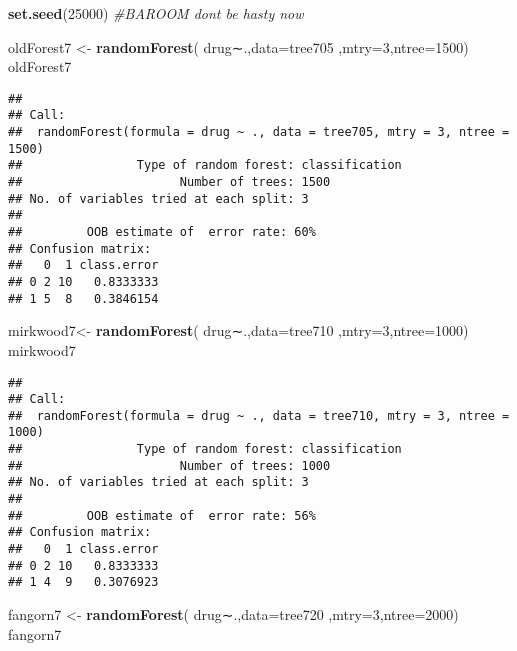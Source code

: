 \documentclass[]{article}
\newenvironment{Shaded}{\begin{snugshade}}{\end{snugshade}}
\newcommand{\KeywordTok}[1]{\textcolor[rgb]{0.13,0.29,0.53}{\textbf{#1}}}
\newcommand{\DataTypeTok}[1]{\textcolor[rgb]{0.13,0.29,0.53}{#1}}
\newcommand{\DecValTok}[1]{\textcolor[rgb]{0.00,0.00,0.81}{#1}}
\newcommand{\StringTok}[1]{\textcolor[rgb]{0.31,0.60,0.02}{#1}}
\newcommand{\CommentTok}[1]{\textcolor[rgb]{0.56,0.35,0.01}{\textit{#1}}}
\newcommand{\NormalTok}[1]{#1}
\begin{document}
\begin{Shaded}
\begin{Highlighting}[]
\KeywordTok{set.seed}\NormalTok{(}\DecValTok{25000}\NormalTok{)}
\CommentTok{#BAROOM dont be hasty now}

\NormalTok{oldForest7 <-}\StringTok{ }\KeywordTok{randomForest}\NormalTok{( drug∼.,}\DataTypeTok{data=}\NormalTok{tree705  ,}\DataTypeTok{mtry=}\DecValTok{3}\NormalTok{,}\DataTypeTok{ntree=}\DecValTok{1500}\NormalTok{)}
\NormalTok{oldForest7}
\end{Highlighting}
\end{Shaded}

\begin{verbatim}
## 
## Call:
##  randomForest(formula = drug ~ ., data = tree705, mtry = 3, ntree = 1500) 
##                Type of random forest: classification
##                      Number of trees: 1500
## No. of variables tried at each split: 3
## 
##         OOB estimate of  error rate: 60%
## Confusion matrix:
##   0  1 class.error
## 0 2 10   0.8333333
## 1 5  8   0.3846154
\end{verbatim}

\begin{Shaded}
\begin{Highlighting}[]
\NormalTok{mirkwood7<-}\StringTok{ }\KeywordTok{randomForest}\NormalTok{( drug∼.,}\DataTypeTok{data=}\NormalTok{tree710  ,}\DataTypeTok{mtry=}\DecValTok{3}\NormalTok{,}\DataTypeTok{ntree=}\DecValTok{1000}\NormalTok{)}
\NormalTok{mirkwood7}
\end{Highlighting}
\end{Shaded}

\begin{verbatim}
## 
## Call:
##  randomForest(formula = drug ~ ., data = tree710, mtry = 3, ntree = 1000) 
##                Type of random forest: classification
##                      Number of trees: 1000
## No. of variables tried at each split: 3
## 
##         OOB estimate of  error rate: 56%
## Confusion matrix:
##   0  1 class.error
## 0 2 10   0.8333333
## 1 4  9   0.3076923
\end{verbatim}

\begin{Shaded}
\begin{Highlighting}[]
\NormalTok{fangorn7 <-}\StringTok{ }\KeywordTok{randomForest}\NormalTok{( drug∼.,}\DataTypeTok{data=}\NormalTok{tree720  ,}\DataTypeTok{mtry=}\DecValTok{3}\NormalTok{,}\DataTypeTok{ntree=}\DecValTok{2000}\NormalTok{)}
\NormalTok{fangorn7}
\end{Highlighting}
\end{Shaded}
\end{document}
